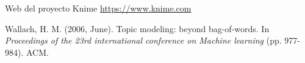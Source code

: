 % 

\begin{thebibliography}{99}

	\emph{} Web del proyecto Knime  \url{https://www.knime.com}
	
\emph{} Wallach, H. M. (2006, June). Topic modeling: beyond bag-of-words. In \textit{Proceedings of the 23rd international conference on Machine learning} (pp. 977-984). ACM.

	
\end{thebibliography}
